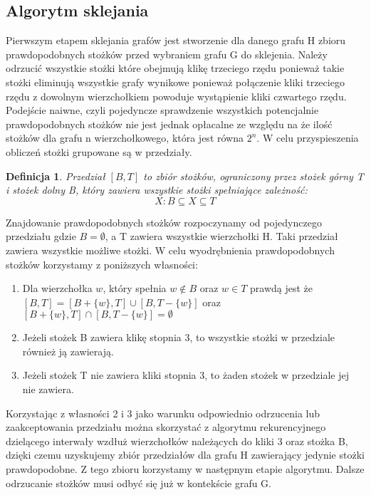 \documentclass[11pt]{article}
\newtheorem{definition}{Definicja}[section]
\begin{document}
\subsection{Algorytm sklejania}
Pierwszym etapem sklejania grafów jest stworzenie dla danego grafu H zbioru prawdopodobnych stożków przed wybraniem grafu G do sklejenia. Należy odrzucić wszystkie stożki które obejmują klikę trzeciego rzędu ponieważ takie stożki eliminują wszystkie grafy wynikowe ponieważ połączenie kliki trzeciego rzędu z dowolnym wierzchołkiem powoduje wystąpienie kliki czwartego rzędu. Podejście naiwne, czyli pojedyncze sprawdzenie wszystkich potencjalnie prawdopodobnych stożków nie jest jednak opłacalne ze względu na że ilość stożków dla grafu n wierzchołkowego, która jest równa $2^n$. W celu przyspieszenia obliczeń stożki grupowane są w przedziały. 

\begin{definition}
Przedział $[B, T]$ to zbiór stożków, ograniczony przez stożek górny T i stożek dolny B, który zawiera wszystkie stożki spełniające zależność:  $$X: B \subseteq X \subseteq T$$ 
\end{definition}


Znajdowanie prawdopodobnych stożków rozpoczynamy od pojedynczego przedziału gdzie $B = \emptyset$, a T zawiera wszystkie wierzchołki H. Taki przedział zawiera wszystkie możliwe stożki. W celu wyodrębnienia prawdopodobnych stożków korzystamy z poniższych własności:
\begin{enumerate}
\item Dla wierzchołka $w$, który spełnia $w \notin B$ oraz $w\in T$ prawdą jest że $[B, T] = [B + \{ w\}, T] \cup [B , T - \{ w\}]$ oraz $[B +\{ w\}, T] \cap [B , T - \{ w\}] = \emptyset$

\item Jeżeli stożek B zawiera klikę stopnia 3, to wszystkie stożki w przedziale również ją zawierają. 

\item Jeżeli stożek T nie zawiera kliki stopnia 3, to żaden stożek w przedziale jej nie zawiera.
\end{enumerate}

Korzystając z własności 2 i 3 jako warunku odpowiednio odrzucenia lub zaakceptowania przedziału można skorzystać z algorytmu rekurencyjnego dzielącego interwały wzdłuż wierzchołków należących do kliki 3 oraz stożka B, dzięki czemu uzyskujemy zbiór przedziałów dla grafu H zawierający jedynie stożki prawdopodobne. Z tego zbioru korzystamy w następnym etapie algorytmu.
Dalsze odrzucanie stożków musi odbyć się już w kontekście grafu G.
  
\end{document}
